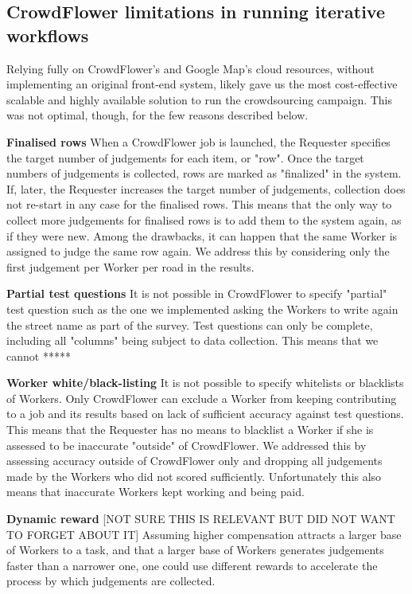 \subsection{CrowdFlower limitations in running iterative workflows}

Relying fully on CrowdFlower's and Google Map's cloud resources, without implementing an original front-end system, likely gave us the most cost-effective scalable and highly available solution to run the crowdsourcing campaign. This was not optimal, though, for the few reasons described below. 

\textbf{Finalised rows} When a CrowdFlower job is launched, the Requester specifies the target number of judgements for each item, or "row". Once the target numbers of judgements is collected, rows are marked as "finalized" in the system. If, later, the Requester increases the target number of judgements, collection does not re-start in any case for the finalised rows. This means that the only way to collect more judgements for finalised rows is to add them to the system again, as if they were new. Among the drawbacks, it can happen that the same Worker is assigned to judge the same row again. We address this by considering only the first judgement per Worker per road in the results.

\textbf{Partial test questions} It is not possible in CrowdFlower to specify "partial" test question such as the one we implemented asking the Workers to write again the street name as part of the survey. Test questions can only be complete, including all "columns" being subject to data collection. This means that we cannot *****  

\textbf{Worker white/black-listing} It is not possible to specify whitelists or blacklists of Workers. Only CrowdFlower can exclude a Worker from keeping contributing to a job and its results based on lack of sufficient accuracy against test questions. This means that the Requester has no means to blacklist a Worker if she is assessed to be inaccurate "outside" of CrowdFlower. We addressed this by assessing accuracy outside of CrowdFlower only and dropping all judgements made by the Workers who did not scored sufficiently. Unfortunately this also means that inaccurate Workers kept working and being paid.

\textbf{Dynamic reward} [NOT SURE THIS IS RELEVANT BUT DID NOT WANT TO FORGET ABOUT IT] Assuming higher compensation attracts a larger base of Workers to a task, and that a larger base of Workers generates judgements faster than a narrower one, one could use different rewards to accelerate the process by which judgements are collected.
